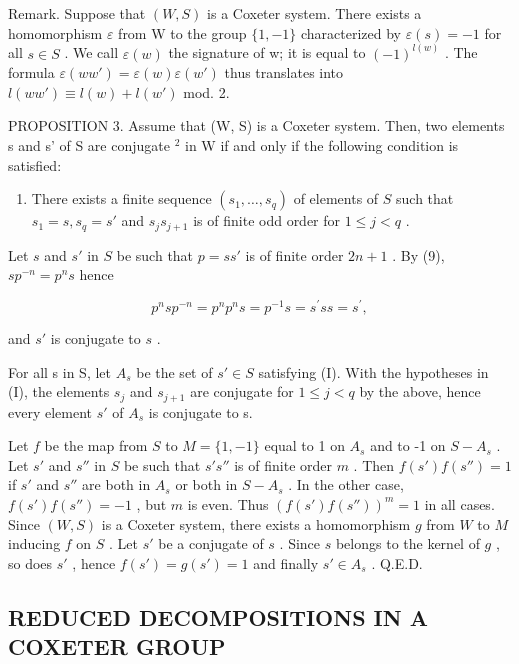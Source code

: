 Remark. Suppose that \((W,S)\) is a Coxeter system. There exists a homomorphism \(\varepsilon\) from W to the group \(\{1,-1\}\) characterized by \(\varepsilon(s)=-1\) for all \(s\in S\) . We call \(\varepsilon(w)\) the signature of w; it is equal to \((-1)^{l(w)}\) . The formula \(\varepsilon(ww')=\varepsilon(w)\varepsilon(w')\) thus translates into \(l(ww')\equiv l(w)+l(w')\) mod. 2.

PROPOSITION 3. Assume that (W, S) is a Coxeter system. Then, two elements s and s' of S are conjugate \(^{2}\) in W if and only if the following condition is satisfied:

\begin{enumerate}
\def\labelenumi{(\Roman{enumi})}
\tightlist
\item
  There exists a finite sequence \((s_1, \ldots, s_q)\) of elements of \(S\) such that \(s_1 = s, s_q = s'\) and \(s_j s_{j+1}\) is of finite odd order for \(1 \leqslant j < q\) .
\end{enumerate}

Let \(s\) and \(s'\) in \(S\) be such that \(p = ss'\) is of finite order \(2n + 1\) . By (9), \(sp^{-n} = p^n s\) hence

\[
p ^ {n} s p ^ {- n} = p ^ {n} p ^ {n} s = p ^ {- 1} s = s ^ {\prime} s s = s ^ {\prime},\tag{10}
\]

and \(s'\) is conjugate to \(s\) .

For all s in S, let \(A_{s}\) be the set of \(s' \in S\) satisfying (I). With the hypotheses in (I), the elements \(s_{j}\) and \(s_{j+1}\) are conjugate for \(1 \leqslant j < q\) by the above, hence every element \(s'\) of \(A_{s}\) is conjugate to s.

Let \(f\) be the map from \(S\) to \(M = \{1, -1\}\) equal to 1 on \(A_s\) and to -1 on \(S - A_s\) . Let \(s'\) and \(s''\) in \(S\) be such that \(s's''\) is of finite order \(m\) . Then \(f(s')f(s'') = 1\) if \(s'\) and \(s''\) are both in \(A_s\) or both in \(S - A_s\) . In the other case, \(f(s')f(s'') = -1\) , but \(m\) is even. Thus \((f(s')f(s''))^m = 1\) in all cases. Since \((W, S)\) is a Coxeter system, there exists a homomorphism \(g\) from \(W\) to \(M\) inducing \(f\) on \(S\) . Let \(s'\) be a conjugate of \(s\) . Since \(s\) belongs to the kernel of \(g\) , so does \(s'\) , hence \(f(s') = g(s') = 1\) and finally \(s' \in A_s\) . Q.E.D.

\subsection{REDUCED DECOMPOSITIONS IN A COXETER GROUP}

